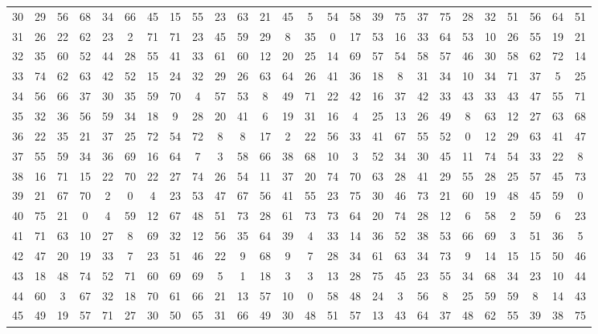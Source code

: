 \begin{table}
\begin{tabular}{c c c c c c c c c c c c c c c c c c c c c c c c c c }
30 & 29 & 56 & 68 & 34 & 66 & 45 & 15 & 55 & 23 & 63 & 21 & 45 & 5 & 54 & 58 & 39 & 75 & 37 & 75 & 28 & 32 & 51 & 56 & 64 & 51 \\
31 & 26 & 22 & 62 & 23 & 2 & 71 & 71 & 23 & 45 & 59 & 29 & 8 & 35 & 0 & 17 & 53 & 16 & 33 & 64 & 53 & 10 & 26 & 55 & 19 & 21 \\
32 & 35 & 60 & 52 & 44 & 28 & 55 & 41 & 33 & 61 & 60 & 12 & 20 & 25 & 14 & 69 & 57 & 54 & 58 & 57 & 46 & 30 & 58 & 62 & 72 & 14 \\
33 & 74 & 62 & 63 & 42 & 52 & 15 & 24 & 32 & 29 & 26 & 63 & 64 & 26 & 41 & 36 & 18 & 8 & 31 & 34 & 10 & 34 & 71 & 37 & 5 & 25 \\
34 & 56 & 66 & 37 & 30 & 35 & 59 & 70 & 4 & 57 & 53 & 8 & 49 & 71 & 22 & 42 & 16 & 37 & 42 & 33 & 43 & 33 & 43 & 47 & 55 & 71 \\
35 & 32 & 36 & 56 & 59 & 34 & 18 & 9 & 28 & 20 & 41 & 6 & 19 & 31 & 16 & 4 & 25 & 13 & 26 & 49 & 8 & 63 & 12 & 27 & 63 & 68 \\
36 & 22 & 35 & 21 & 37 & 25 & 72 & 54 & 72 & 8 & 8 & 17 & 2 & 22 & 56 & 33 & 41 & 67 & 55 & 52 & 0 & 12 & 29 & 63 & 41 & 47 \\
37 & 55 & 59 & 34 & 36 & 69 & 16 & 64 & 7 & 3 & 58 & 66 & 38 & 68 & 10 & 3 & 52 & 34 & 30 & 45 & 11 & 74 & 54 & 33 & 22 & 8 \\
38 & 16 & 71 & 15 & 22 & 70 & 22 & 27 & 74 & 26 & 54 & 11 & 37 & 20 & 74 & 70 & 63 & 28 & 41 & 29 & 55 & 28 & 25 & 57 & 45 & 73 \\
39 & 21 & 67 & 70 & 2 & 0 & 4 & 23 & 53 & 47 & 67 & 56 & 41 & 55 & 23 & 75 & 30 & 46 & 73 & 21 & 60 & 19 & 48 & 45 & 59 & 0 \\
40 & 75 & 21 & 0 & 4 & 59 & 12 & 67 & 48 & 51 & 73 & 28 & 61 & 73 & 73 & 64 & 20 & 74 & 28 & 12 & 6 & 58 & 2 & 59 & 6 & 23 \\
41 & 71 & 63 & 10 & 27 & 8 & 69 & 32 & 12 & 56 & 35 & 64 & 39 & 4 & 33 & 14 & 36 & 52 & 38 & 53 & 66 & 69 & 3 & 51 & 36 & 5 \\
42 & 47 & 20 & 19 & 33 & 7 & 23 & 51 & 46 & 22 & 9 & 68 & 9 & 7 & 28 & 34 & 61 & 63 & 34 & 73 & 9 & 14 & 15 & 15 & 50 & 46 \\
43 & 18 & 48 & 74 & 52 & 71 & 60 & 69 & 69 & 5 & 1 & 18 & 3 & 3 & 13 & 28 & 75 & 45 & 23 & 55 & 34 & 68 & 34 & 23 & 10 & 44 \\
44 & 60 & 3 & 67 & 32 & 18 & 70 & 61 & 66 & 21 & 13 & 57 & 10 & 0 & 58 & 48 & 24 & 3 & 56 & 8 & 25 & 59 & 59 & 8 & 14 & 43 \\
45 & 49 & 19 & 57 & 71 & 27 & 30 & 50 & 65 & 31 & 66 & 49 & 30 & 48 & 51 & 57 & 13 & 43 & 64 & 37 & 48 & 62 & 55 & 39 & 38 & 75 \\

\end{tabular}
\end{table}
